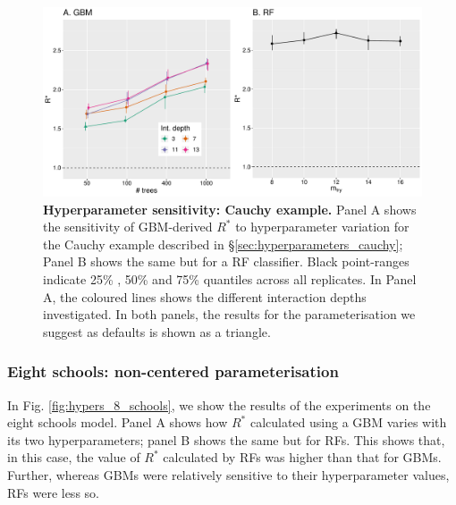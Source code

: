 \documentclass[ba]{imsart}
\numberwithin{equation}{section}
\theoremstyle{plain}
\begin{document}
\begin{supplement}
		\begin{figure}[!htb]
			\centerline{\includegraphics[width=1.0\textwidth]{hypers_cauchy.pdf}}
			\caption{\textbf{Hyperparameter sensitivity: Cauchy example.} Panel A shows the sensitivity of GBM-derived $R^*$ to hyperparameter variation for the Cauchy example described in \S\ref{sec:hyperparameters_cauchy}; Panel B shows the same but for a RF classifier. Black point-ranges indicate 25\% , 50\% and 75\% quantiles across all replicates. In Panel A, the coloured lines shows the different interaction depths investigated. In both panels, the results for the parameterisation we suggest as defaults is shown as a triangle.}
			\label{fig:hypers_cauchy}
		\end{figure}
		
		\subsubsection{Eight schools: non-centered parameterisation}\label{sec:hyperparameters_8_schools}
		In Fig. \ref{fig:hypers_8_schools}, we show the results of the experiments on the eight schools model. Panel A shows how $R^*$ calculated using a GBM varies with its two hyperparameters; panel B shows the same but for RFs. This shows that, in this case, the value of $R^*$ calculated by RFs was higher than that for GBMs. Further, whereas GBMs were relatively sensitive to their hyperparameter values, RFs were less so.
		

\end{supplement}
\end{document}
